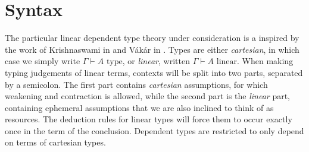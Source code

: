 %
\section{Syntax}
The particular linear dependent type theory under consideration is a inspired by the work of Krishnaswami in \cite{krishnaswami} and Vákár in \cite{vakar14}. Types are either \textit{cartesian}, in which case we simply write $\Gamma \vdash A \text{ type}$, or \textit{linear}, written $\Gamma \vdash A \text{ linear}$. When making typing judgements of linear terms, contexts will be split into two parts, separated by a semicolon. The first part contains \textit{cartesian} assumptions, for which weakening and contraction is allowed, while the second part is the \textit{linear} part, containing ephemeral assumptions that we are also inclined to think of as resources. The deduction rules for linear types will force them to occur exactly once in the term of the conclusion. Dependent types are restricted to only depend on terms of cartesian types. 
